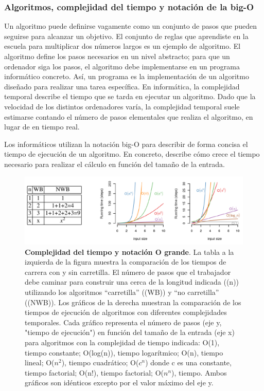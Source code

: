 \subsubsection{Algoritmos, complejidad del tiempo y notación de la big-O}
Un algoritmo puede definirse vagamente como un conjunto de pasos que pueden seguirse para alcanzar un objetivo. El conjunto de reglas que aprendiste en la escuela para multiplicar dos números largos es un ejemplo de algoritmo. El algoritmo define los pasos necesarios en un nivel abstracto; para que un ordenador siga los pasos, el algoritmo debe implementarse en un programa informático concreto. Así, un programa es la implementación de un algoritmo diseñado para realizar una tarea específica. En informática, la complejidad temporal describe el tiempo que se tarda en ejecutar un algoritmo. Dado que la velocidad de los distintos ordenadores varía, la complejidad temporal suele estimarse contando el número de pasos elementales que realiza el algoritmo, en lugar de en tiempo real. 

Los informáticos utilizan la notación big-O para describir de forma concisa el tiempo de ejecución de un algoritmo. En concreto, describe cómo crece el tiempo necesario para realizar el cálculo en función del tamaño de la entrada. 

\begin{figure}[htbp]
\centering
\includegraphics[width = \textwidth]{figs/big-o.png}
\caption{\textbf{Complejidad del tiempo y notación O grande}. La tabla a la izquierda de la figura muestra la comparación de los tiempos de carrera con y sin carretilla. El número de pasos que el trabajador debe caminar para construir una cerca de la longitud indicada ((n)) utilizando los algoritmos “carretilla” ((WB)) y “no carretilla” ((NWB)). Los gráficos de la derecha muestran la comparación de los tiempos de ejecución de algoritmos con diferentes complejidades temporales. Cada gráfico representa el número de pasos (eje y, "tiempo de ejecución") en función del tamaño de la entrada (eje x) para algoritmos con la complejidad de tiempo indicada: O(1), tiempo constante; O(log(n)), tiempo logarítmico; O(n), tiempo lineal; O($n^2$), tiempo cuadrático; O($c^n$) donde c es una constante, tiempo factorial; O(n!), tiempo factorial; O($n^n$), tiempo. Ambos gráficos son idénticos excepto por el valor máximo del eje y.}
\label{fig:big-O}
\end{figure}

